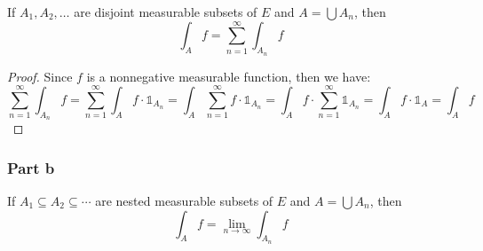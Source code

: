 \begin{question}
    If $A_1, A_2, \ldots$ are disjoint measurable subsets of $E$ and $A=\bigcup A_n$, then
    $$
    \int_A f=\sum_{n=1}^{\infty} \int_{A_n} f
    $$
\end{question}

\begin{answer}
    \begin{proof}
        Since $f$ is a nonnegative measurable function, then we have:
        \begin{equation}
                \sum_{n=1}^{\infty} \int_{A_n} f = \sum_{n=1}^{\infty} \int_A f \cdot \mathbb{1}_{A_n} = \int_A \sum_{n=1}^{\infty} f \cdot \mathbb{1}_{A_n} = \int_A f \cdot \sum_{n=1}^{\infty} \mathbb{1}_{A_n} = \int_A f \cdot \mathbb{1}_A = \int_A f
        \end{equation}
    \end{proof}
\end{answer}

\subsubsection{Part b}

\begin{question}
    If $A_1 \subseteq A_2 \subseteq \cdots$ are nested measurable subsets of $E$ and $A=\bigcup A_n$, then
    $$
    \int_A f=\lim _{n \rightarrow \infty} \int_{A_n} f
    $$
\end{question}

